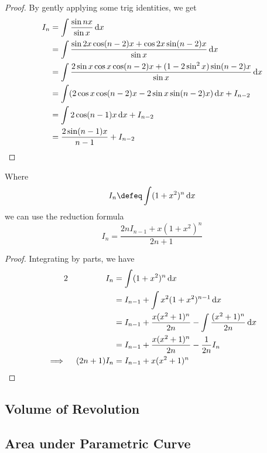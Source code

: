 \begin{proof}
 By gently applying some trig identities, we get
 \begin{align*}
  I_n &= \integ{\frac{\sin nx}{\sin x}}{x} \\
      &= \integ{\frac{\sin 2x \cos (n - 2)x +
                      \cos 2x \sin (n - 2) x}{\sin x}}{x} \\
      &= \integ{\frac{2\sin x \cos x \cos (n - 2)x +
                      (1 - 2 \sin^2 x) \sin (n - 2) x}{\sin x}}{x} \\
      &= \integ{(2\cos x \cos (n - 2)x - 2\sin x \sin (n - 2) x)}{x}
         + I_{n - 2} \\
      &= \integ{2 \cos (n - 1) x}{x} + I_{n - 2} \\
      &= \frac{2 \sin (n - 1) x}{n - 1} + I_{n - 2} \qedhere
 \end{align*}
\end{proof}
\begin{theorem}
 Where
 \begin{equation*}
  I_n \defeq \integ{(1 + x^2)^n}{x}
 \end{equation*}
 we can use the reduction formula
 \begin{equation*}
  I_n = \frac{2n I_{n - 1} + x(1 + x^2)^n}{2n + 1}
 \end{equation*}
\end{theorem}
\begin{proof}
 Integrating by parts, we have
 \begin{alignat*}2
  && I_n &= \integ{(1 + x^2)^n}{x} \\
  &&     &= I_{n - 1} + \integ{x^2 (1 + x^2)^{n - 1}}{x} \\
  &&     &= I_{n - 1} + \frac{x(x^2 + 1)^n}{2n} -
                        \integ{\frac{(x^2 + 1)^n}{2n}}{x} \\
  &&     &= I_{n - 1} + \frac{x(x^2 + 1)^n}{2n} - \frac 1{2n} I_n \\
  \implies{}&& (2n + 1) I_n
         &= I_{n - 1} + x(x^2 + 1)^n \qedhere
 \end{alignat*}
\end{proof}

\subsection{Volume of Revolution}

\subsection{Area under Parametric Curve} \label{sec_calc_parametric_area}

